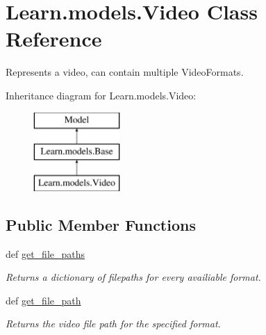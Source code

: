 \hypertarget{class_learn_1_1models_1_1_video}{\section{Learn.\-models.\-Video Class Reference}
\label{class_learn_1_1models_1_1_video}
}


Represents a video, can contain multiple Video\-Formats.  


Inheritance diagram for Learn.\-models.\-Video\-:\begin{figure}[H]
\begin{center}
\leavevmode
\includegraphics[height=3.000000cm]{class_learn_1_1models_1_1_video}
\end{center}
\end{figure}
\subsection*{Public Member Functions}
\begin{DoxyCompactItemize}
\item 
\hypertarget{class_learn_1_1models_1_1_video_a45139e19d67924b2afee255d5e6d35ff}{def \hyperlink{class_learn_1_1models_1_1_video_a45139e19d67924b2afee255d5e6d35ff}{get\-\_\-file\-\_\-paths}}\label{class_learn_1_1models_1_1_video_a45139e19d67924b2afee255d5e6d35ff}

\begin{DoxyCompactList}\small\item\em Returns a dictionary of filepaths for every availiable format. \end{DoxyCompactList}\item 
\hypertarget{class_learn_1_1models_1_1_video_a23fa5974b44b04711871a2f3a788da7d}{def \hyperlink{class_learn_1_1models_1_1_video_a23fa5974b44b04711871a2f3a788da7d}{get\-\_\-file\-\_\-path}}\label{class_learn_1_1models_1_1_video_a23fa5974b44b04711871a2f3a788da7d}

\begin{DoxyCompactList}\small\item\em Returns the video file path for the specified format. \end{DoxyCompactList}\end{DoxyCompactItemize}
